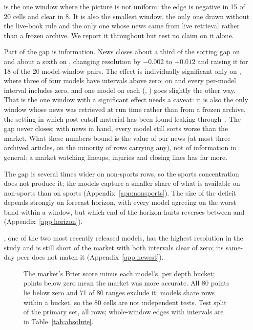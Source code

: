 \winA is the one window where the picture is not uniform: the edge is negative in
15 of 20 cells and clear in 8. It is also the smallest window, the only one drawn
without the live-book rule and the only one whose news came from live retrieval
rather than a frozen archive. We report it throughout but rest no claim on it
alone.

Part of the gap is information. News closes about a third of the sorting gap on
\winA and about a sixth on \winB, changing resolution by $-0.002$ to $+0.012$
and raising it for 18 of the 20 model-window pairs. The effect is individually
significant only on \winA, where three of four models have intervals above zero;
on \winB and \winC every per-model interval includes zero, and one model on each
(\mGlmFiveOne, \mDeepSeekVThreeTwo) goes slightly the other way. That \winA is the one window with a significant effect needs a caveat: it is
also the only window whose news was retrieved at run time rather than from a
frozen archive, the setting in which post-cutoff material has been found
leaking through~\citep{ellahib2026}. The gap never
closes: with news in hand, every model still sorts worse than the market. What
these numbers bound is the value of our news (at most three archived articles, on
the minority of rows carrying any), not of information in general; a market
watching lineups, injuries and closing lines has far more.

The gap is several times wider on non-sports rows, so the sports concentration
does not produce it; the models capture a smaller share of what is available on
non-sports than on sports (Appendix~\ref{app:nonsports}). The size of the
deficit depends strongly on forecast horizon, with every model agreeing on the
worst band within a window, but which end of the horizon hurts reverses between
\winB and \winC (Appendix~\ref{app:horizon}).

\mGptFiveFive, one of the two most recently released models, has the highest
resolution in the study and is still short of the market with both intervals
clear of zero; its same-day peer \mDeepSeekVFourPro does not match it
(Appendix~\ref{app:newest}).

\begin{figure}[!tbp]
\centering

\caption{The market's Brier score minus each model's, per depth bucket; points below zero
mean the market was more accurate. All 80 points lie below zero and 71 of 80 ranges exclude
it; models share rows within a bucket, so the 80 cells are not independent tests. Test split
of the primary set, all rows; whole-window edges with intervals are in Table~\ref{tab:absolute}.}
\label{fig:brier-gap}
\end{figure}

